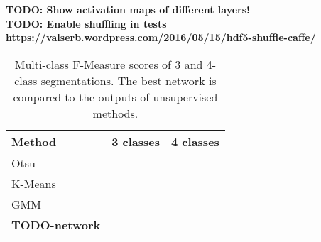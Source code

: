 \textbf{TODO: Show activation maps of different layers!}\\
\textbf{TODO: Enable shuffling in tests https://valserb.wordpress.com/2016/05/15/hdf5-shuffle-caffe/}\\


\begin {table}
	\centering
	\begin {tabular}[!ht]{|l|c|c|}
		\hline
		\textbf{Method}& \textbf{3 classes}& \textbf{4 classes}\\ \hline
		Otsu& & \\ \hline
		K-Means& & \\ \hline
		GMM& & \\ \hline
		\textbf{TODO-network}& & \\ \hline
	\end {tabular}
\caption[Multi-class F-Measure scores of the best network in comparison to the unsupervised methods.]{Multi-class F-Measure scores of 3 and 4-class segmentations. The best network is compared to the outputs of unsupervised methods.}
\end {table}